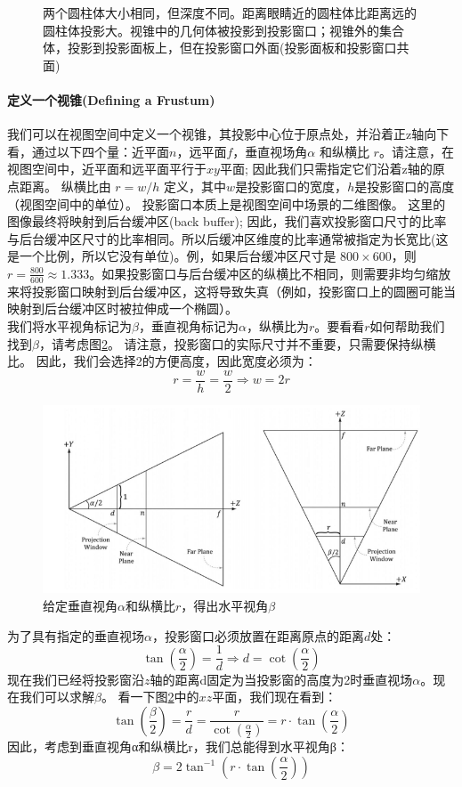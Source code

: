 \documentclass[11pt,a4paper,oldfontcommands]{memoir}
\begin{document}
{\begin{figure}[t]
    \centering
    \caption{两个圆柱体大小相同，但深度不同。距离眼睛近的圆柱体比距离远的圆柱体投影大。视锥中的几何体被投影到投影窗口；视锥外的集合体，投影到投影面板上，但在投影窗口外面(投影面板和投影窗口共面)}
    \label{fig:5-22}
\end{figure}

\paragraph{定义一个视锥(Defining a Frustum)}
\begin{flushleft}
我们可以在视图空间中定义一个视锥，其投影中心位于原点处，并沿着正z轴向下看，通过以下四个量：近平面$n$，远平面$f$，垂直视场角$\alpha$ 和纵横比 $r$。请注意，在视图空间中，近平面和远平面平行于$xy$平面; 因此我们只需指定它们沿着z轴的原点距离。 纵横比由 $r=w/h$ 定义，其中$w$是投影窗口的宽度，$h$是投影窗口的高度（视图空间中的单位）。 投影窗口本质上是视图空间中场景的二维图像。 这里的图像最终将映射到后台缓冲区(back buffer); 因此，我们喜欢投影窗口尺寸的比率与后台缓冲区尺寸的比率相同。所以后缓冲区维度的比率通常被指定为长宽比(这是一个比例，所以它没有单位)。例，如果后台缓冲区尺寸是 $800 \times 600$，则 $r=\frac{800}{600} \approx 1.333$。如果投影窗口与后台缓冲区的纵横比不相同，则需要非均匀缩放来将投影窗口映射到后台缓冲区，这将导致失真（例如，投影窗口上的圆圈可能当映射到后台缓冲区时被拉伸成一个椭圆）。\\
我们将水平视角标记为$\beta$，垂直视角标记为$\alpha$，纵横比为$r$。要看看$r$如何帮助我们找到$\beta$，请考虑图\ref{fig:5-23}。 请注意，投影窗口的实际尺寸并不重要，只需要保持纵横比。 因此，我们会选择2的方便高度，因此宽度必须为：\\
$$r=\frac{w}{h}=\frac{w}{2}\Rightarrow w=2r$$
\end{flushleft}
\begin{figure}[t]
    \includegraphics[width=\textwidth]{5-23}
    \centering
    \caption{给定垂直视角$\alpha$和纵横比$r$，得出水平视角$\beta$}
    \label{fig:5-23}
\end{figure}
\begin{flushleft}
为了具有指定的垂直视场$\alpha$，投影窗口必须放置在距离原点的距离$d$处：
$$\tan(\frac{\alpha}{2})=\frac{1}{d}\Rightarrow d=\cot(\frac{\alpha}{2})$$
现在我们已经将投影窗沿$z$轴的距离d固定为当投影窗的高度为2时垂直视场$\alpha$。现在我们可以求解$\beta$。 看一下图\ref{fig:5-23}中的$xz$平面，我们现在看到：
$$\tan(\frac{\beta}{2})=\frac{r}{d}=\frac{r}{\cot(\frac{\alpha}{2})}=r\cdot \tan(\frac{\alpha}{2})$$
因此，考虑到垂直视角α和纵横比r，我们总能得到水平视角β：
$$\beta=2\tan^{-1}(r\cdot\tan(\frac{\alpha}{2}))$$
\end{flushleft}

}
\end{document}
